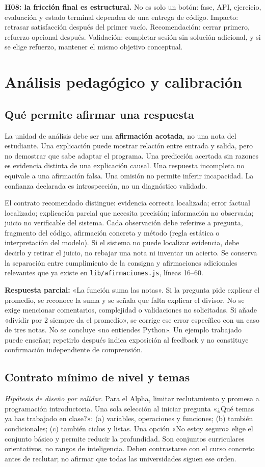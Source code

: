 \documentclass[11pt,a4paper]{report}
\newcommand{\src}[2]{\nolinkurl{#1}, líneas #2}
\newcommand{\hip}{\textit{Hipótesis de diseño por validar.}}
\begin{document}
\textbf{H08: la fricción final es estructural.} No es solo un botón: fase, API, ejercicio, evaluación y estado terminal dependen de una entrega de código. Impacto: retrasar satisfacción después del primer vacío. Recomendación: cerrar primero, refuerzo opcional después. Validación: completar sesión sin solución adicional, y si se elige refuerzo, mantener el mismo objetivo conceptual.

\chapter{Análisis pedagógico y calibración}
\label{ch:pedagogia}
\section{Qué permite afirmar una respuesta}
La unidad de análisis debe ser una \textbf{afirmación acotada}, no una nota del estudiante. Una explicación puede mostrar relación entre entrada y salida, pero no demostrar que sabe adaptar el programa. Una predicción acertada sin razones es evidencia distinta de una explicación causal. Una respuesta incompleta no equivale a una afirmación falsa. Una omisión no permite inferir incapacidad. La confianza declarada es introspección, no un diagnóstico validado.

El contrato recomendado distingue: evidencia correcta localizada; error factual localizado; explicación parcial que necesita precisión; información no observada; juicio no verificable del sistema. Cada observación debe referirse a pregunta, fragmento del código, afirmación concreta y método (regla estática o interpretación del modelo). Si el sistema no puede localizar evidencia, debe decirlo y retirar el juicio, no rebajar una nota ni inventar un acierto. Se conserva la separación entre cumplimiento de la consigna y afirmaciones adicionales relevantes que ya existe en \src{lib/afirmaciones.js}{16--60}.

\textbf{Respuesta parcial:} «La función suma las notas». Si la pregunta pide explicar el promedio, se reconoce la suma y se señala que falta explicar el divisor. No se exige mencionar comentarios, complejidad o validaciones no solicitadas. Si añade «dividir por 2 siempre da el promedio», se corrige ese error específico con un caso de tres notas. No se concluye «no entiendes Python». Un ejemplo trabajado puede enseñar; repetirlo después indica exposición al feedback y no constituye confirmación independiente de comprensión.

\section{Contrato mínimo de nivel y temas}
\hip{} Para el Alpha, limitar reclutamiento y promesa a programación introductoria. Una sola selección al iniciar pregunta «¿Qué temas ya has trabajado en clase?»: (a) variables, operaciones y funciones; (b) también condicionales; (c) también ciclos y listas. Una opción «No estoy seguro» elige el conjunto básico y permite reducir la profundidad. Son conjuntos curriculares orientativos, no rangos de inteligencia. Deben contrastarse con el curso concreto antes de reclutar; no afirmar que todas las universidades siguen ese orden.
\end{document}
